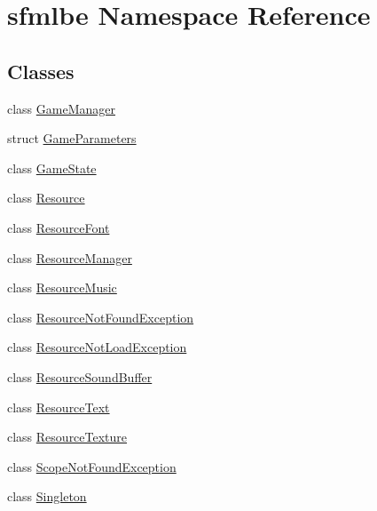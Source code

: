 \hypertarget{namespacesfmlbe}{}\section{sfmlbe Namespace Reference}
\label{namespacesfmlbe}
\subsection*{Classes}
\begin{DoxyCompactItemize}
\item 
class \mbox{\hyperlink{classsfmlbe_1_1_game_manager}{Game\+Manager}}
\item 
struct \mbox{\hyperlink{structsfmlbe_1_1_game_parameters}{Game\+Parameters}}
\item 
class \mbox{\hyperlink{classsfmlbe_1_1_game_state}{Game\+State}}
\item 
class \mbox{\hyperlink{classsfmlbe_1_1_resource}{Resource}}
\item 
class \mbox{\hyperlink{classsfmlbe_1_1_resource_font}{Resource\+Font}}
\item 
class \mbox{\hyperlink{classsfmlbe_1_1_resource_manager}{Resource\+Manager}}
\item 
class \mbox{\hyperlink{classsfmlbe_1_1_resource_music}{Resource\+Music}}
\item 
class \mbox{\hyperlink{classsfmlbe_1_1_resource_not_found_exception}{Resource\+Not\+Found\+Exception}}
\item 
class \mbox{\hyperlink{classsfmlbe_1_1_resource_not_load_exception}{Resource\+Not\+Load\+Exception}}
\item 
class \mbox{\hyperlink{classsfmlbe_1_1_resource_sound_buffer}{Resource\+Sound\+Buffer}}
\item 
class \mbox{\hyperlink{classsfmlbe_1_1_resource_text}{Resource\+Text}}
\item 
class \mbox{\hyperlink{classsfmlbe_1_1_resource_texture}{Resource\+Texture}}
\item 
class \mbox{\hyperlink{classsfmlbe_1_1_scope_not_found_exception}{Scope\+Not\+Found\+Exception}}
\item 
class \mbox{\hyperlink{classsfmlbe_1_1_singleton}{Singleton}}
\end{DoxyCompactItemize}
